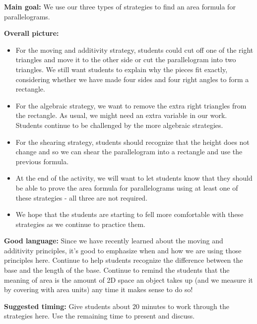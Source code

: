 \documentclass[nooutcomes,noauthor]{ximera}
\begin{document}
\newpage

\begin{instructorNotes} 

{\bf Main goal:} We use our three types of strategies to find an area formula for parallelograms.

{\bf Overall picture:} 
\begin{itemize}
	\item For the moving and additivity strategy, students could cut off one of the right triangles and move it to the other side or cut the parallelogram into two triangles. We still want students to explain why the pieces fit exactly, considering whether we have made four sides and four right angles to form a rectangle.
	\item For the algebraic strategy, we want to remove the extra right triangles from the rectangle. As usual, we might need an extra variable in our work. Students continue to be challenged by the more algebraic strategies.
	\item For the shearing strategy, students should recognize that the height does not change and so we can shear the parallelogram into a rectangle and use the previous formula. 
	\item At the end of the activity, we will want to let students know that they should be able to prove the area formula for parallelograms using at least one of these strategies - all three are not required.
	\item We hope that the students are starting to fell more comfortable with these strategies as we continue to practice them.
\end{itemize}


{\bf Good language:} Since we have recently learned about the moving and additivity principles, it's good to emphasize when and how we are using those principles here. Continue to help students recognize the difference between the base and the length of the base. Continue to remind the students that the meaning of area is the amount of 2D space an object takes up (and we measure it by covering with area units) any time it makes sense to do so!



{\bf Suggested timing:} Give students about $20$ minutes to work through the strategies here. Use the remaining time to present and discuss.



\end{instructorNotes}
\end{document}
